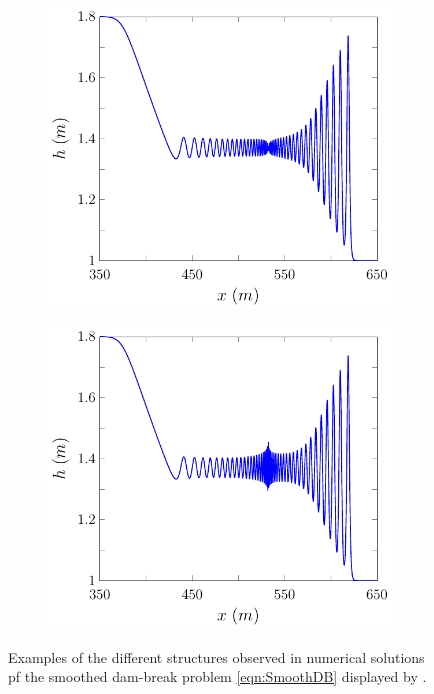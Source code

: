 \begin{figure}
\begin{subfigure}{0.5\textwidth}
		\vspace{0.5cm}
	\end{subfigure}
	\begin{subfigure}{0.5\textwidth}
		\includegraphics[width=\textwidth]{./chp2/figures/DamBreakStruct/9.pdf}
		\vspace{0.5cm}
	\end{subfigure}%
	\begin{subfigure}{0.5\textwidth}
		\includegraphics[width=\textwidth]{./chp2/figures/DamBreakStruct/20.pdf}
		\vspace{0.5cm}
	\end{subfigure}
	\caption{Examples of the different structures observed in numerical solutions pf the smoothed dam-break problem \eqref{eqn:SmoothDB} displayed by \citet{Pitt-2018-61}.}
	\label{fig:DBExAll}
\end{figure}

